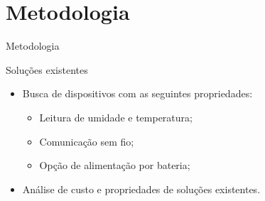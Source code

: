 \section{Metodologia}


\begin{frame}
    
    \centering
    \color{blue_theme}\huge{{Metodologia}}

\end{frame}




\begin{frame}{Soluções existentes}


    
        \begin{itemize}
            \item Busca de dispositivos com as seguintes propriedades:
                \begin{itemize}
                    \item Leitura de umidade e temperatura;
                    \item Comunicação sem fio;
                    \item Opção de alimentação por bateria;
                \end{itemize}
            
            \item Análise de custo e propriedades de soluções existentes.
        \end{itemize}
    
    
	
    \end{frame}
    
